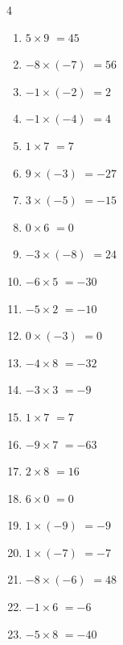 \begin{multicols}{4}
\begin{enumerate}
  \item $5\times 9$
        $=45$

  \item $-8\times (-7)$
        $=56$

  \item $-1\times (-2)$
        $=2$

  \item $-1\times (-4)$
        $=4$

  \item $1\times 7$
        $=7$

  \item $9\times (-3)$
        $=-27$

  \item $3\times (-5)$
        $=-15$

  \item $0\times 6$
        $=0$

  \item $-3\times (-8)$
        $=24$

  \item $-6\times 5$
        $=-30$

  \item $-5\times 2$
        $=-10$

  \item $0\times (-3)$
        $=0$

  \item $-4\times 8$
        $=-32$

  \item $-3\times 3$
        $=-9$

  \item $1\times 7$
        $=7$

  \item $-9\times 7$
        $=-63$

  \item $2\times 8$
        $=16$

  \item $6\times 0$
        $=0$

  \item $1\times (-9)$
        $=-9$

  \item $1\times (-7)$
        $=-7$

  \item $-8\times (-6)$
        $=48$

  \item $-1\times 6$
        $=-6$

  \item $-5\times 8$
        $=-40$


\end{enumerate}
\end{multicols}
